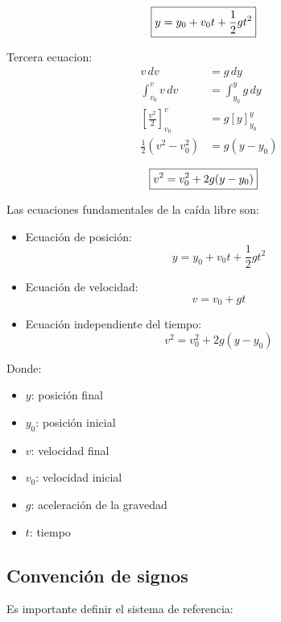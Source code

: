 \vspace{-20pt}

\begin{align}
    \Aboxed{y = y_0 + v_0 t + \frac{1}{2}gt^2}
\end{align}

Tercera ecuacion:
\begin{align*}
v\,dv &= g\,dy \\
\int_{v_0}^{v} v\,dv &= \int_{y_0}^{y} g\,dy \\
\left[\frac{v^2}{2}\right]_{v_0}^{v} &= g\left[y\right]_{y_0}^{y} \\
\frac{1}{2}(v^2 - v_0^2) &= g(y - y_0)
\end{align*}

\vspace{-30pt}

\begin{align}
    \Aboxed{v^2 = v_0^2 + 2g(y - y_0)}
\end{align}

Las ecuaciones fundamentales de la caída libre son:

\begin{itemize}
    \item Ecuación de posición:
    \[
    y = y_0 + v_0 t + \frac{1}{2}gt^2
    \]

    \item Ecuación de velocidad:
    \[
    v = v_0 + gt
    \]

    \item Ecuación independiente del tiempo:
    \[
    v^2 = v_0^2 + 2g(y - y_0)
    \]
\end{itemize}

Donde:
\begin{itemize}
    \setlength{\itemsep}{0pt}
    \item $y$: posición final
    \item $y_0$: posición inicial
    \item $v$: velocidad final
    \item $v_0$: velocidad inicial
    \item $g$: aceleración de la gravedad
    \item $t$: tiempo
\end{itemize}

\subsection{Convención de signos}

Es importante definir el sistema de referencia:

